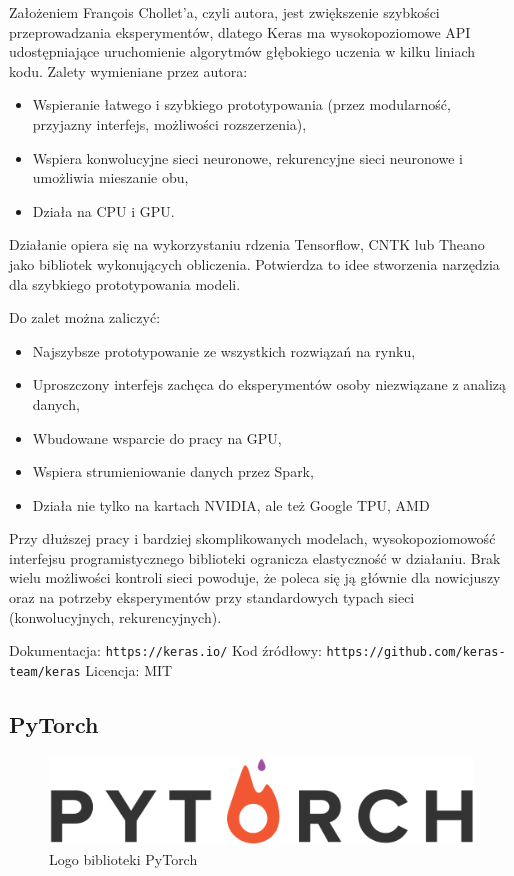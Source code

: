 \documentclass[12pt,a4paper,twoside,titlepage,openright]{book}
\begin{document}
Założeniem François Chollet'a, czyli autora, jest zwiększenie szybkości przeprowadzania eksperymentów, dlatego Keras ma wysokopoziomowe API udostępniające uruchomienie algorytmów głębokiego uczenia w kilku liniach kodu. Zalety wymieniane przez autora:
\begin{itemize}
\item Wspieranie łatwego i szybkiego prototypowania (przez modularność, przyjazny interfejs, możliwości rozszerzenia),
\item Wspiera konwolucyjne sieci neuronowe, rekurencyjne sieci neuronowe i umożliwia mieszanie obu,
\item Działa na CPU i GPU.
\end{itemize}

Działanie opiera się na wykorzystaniu rdzenia Tensorflow, CNTK lub Theano jako bibliotek wykonujących obliczenia. Potwierdza to idee stworzenia narzędzia dla szybkiego prototypowania modeli. \cite{bookDeepLearningKeras}

Do zalet można zaliczyć:
\begin{itemize}
\item Najszybsze prototypowanie ze wszystkich rozwiązań na rynku,
\item Uproszczony interfejs zachęca do eksperymentów osoby niezwiązane z analizą danych,
\item Wbudowane wsparcie do pracy na GPU,
\item Wspiera strumieniowanie danych przez Spark,
\item Działa nie tylko na kartach NVIDIA, ale też Google TPU, AMD
\end{itemize}

Przy dłuższej pracy i bardziej skomplikowanych modelach, wysokopoziomowość interfejsu programistycznego biblioteki ogranicza elastyczność w działaniu. Brak wielu możliwości kontroli sieci powoduje, że poleca się ją głównie dla nowicjuszy oraz na potrzeby eksperymentów przy standardowych typach sieci (konwolucyjnych, rekurencyjnych).

\noindent
\newline 
Dokumentacja: \texttt{https://keras.io/}
\newline 
Kod źródłowy: \texttt{https://github.com/keras-team/keras}
\newline 
Licencja: MIT

\subsection{PyTorch}
\begin{figure}[ht]
	\centering
			\includegraphics[resolution=100, scale=0.5]{PyTorch.png}
		\caption{Logo biblioteki PyTorch}
\end{figure}
\end{document}
